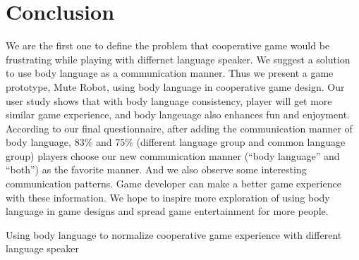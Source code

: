 \section{Conclusion}



We are the first one to define the problem that cooperative game would be frustrating while playing with differnet language speaker. We suggest a solution to use body language as a communication manner. Thus we present a game prototype, Mute Robot, using body language in cooperative game design. Our user study shows that with body language consistency, player will get more similar game experience, and body langeuage also enhances fun and enjoyment. According to our final questionnaire, 
after adding the communication manner of body language, 83\% and 75\% (different language group and common language group) players choose our new communication manner (``body language'' and ``both'') as the favorite manner. 
And we also observe some interesting communication patterns. Game developer can make a better game experience with these information. We hope to inspire more exploration of using body language in game designs and spread game entertainment for more people.


Using body language to normalize cooperative game experience with different language speaker

